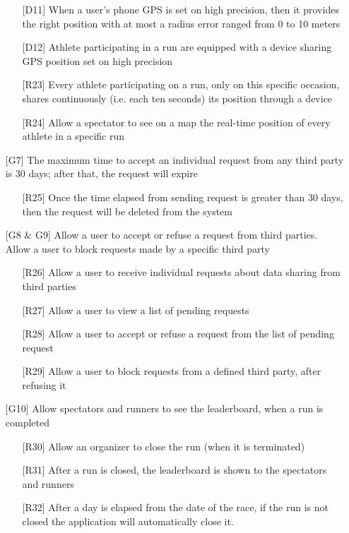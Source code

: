 \begin{itemize}
\begin{itemize}
	\item[{[D11]}] When a user's phone GPS is set on high precision, then it provides the right position with at most a radius error ranged from 0 to 10 meters
	\item[{[D12]}] Athlete participating in a run are equipped with a device sharing GPS position set on high precision
	\item[{[R23]}] Every athlete participating on a run, only on this specific occasion, shares continuously (i.e. each ten seconds) its position through a device
	\item[{[R24]}] Allow a spectator to see on a map the real-time position of every athlete in a specific run
	\end{itemize}
\item[{[G7]}] The maximum time to accept an individual request from any third party is 30 days; after that, the request will expire
	\begin{itemize}
	\item[{[R25]}] Once the time elapsed from sending request is greater than 30 days, then the request will be deleted from the system
	\end{itemize}
\item[{[G8 \& G9]}] Allow a user to accept or refuse a request from third parties. Allow a user to block requests made by a specific third party
	\begin{itemize}
	\item[{[R26]}] Allow a user to receive individual requests about data sharing from third parties
	\item[{[R27]}] Allow a user to view a list of pending requests
	\item[{[R28]}] Allow a user to accept or refuse a request from the list of pending request
	\item[{[R29]}] Allow a user to block requests from a defined third party, after refusing it
	\end{itemize}	
\item[{[G10]}] Allow spectators and runners to see the leaderboard, when a run is completed
	\begin{itemize}
	\item[{[R30]}] Allow an organizer to close the run (when it is terminated)
	\item[{[R31]}] After a run is closed, the leaderboard is shown to the spectators and runners
	\item[{[R32]}] After a day is elapsed from the date of the race, if the run is not closed the application will automatically close it.

\end{itemize}
\end{itemize}
